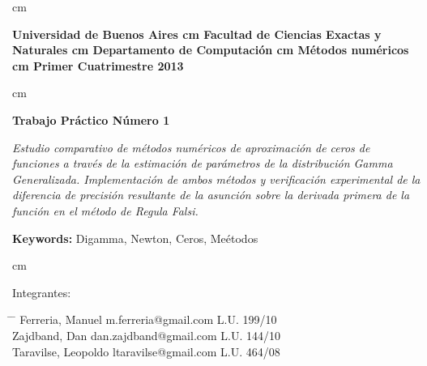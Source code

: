  cm
\begin{flushright}
\huge\bf Universidad de Buenos Aires
 cm
\Large\bf Facultad de Ciencias Exactas y Naturales
 cm
\Large\bf Departamento de Computaci\'on
 cm
\Large\bf  M\'etodos num\'ericos
 cm
\Large\bf Primer Cuatrimestre 2013
\end{flushright}

 cm
\begin{center}
\LARGE\bf Trabajo Pr\'actico N\'umero 1

\vskip 1.0cm
\normalsize \emph{Estudio comparativo de m\'etodos num\'ericos de aproximaci\'on de ceros de funciones a trav\'es de la estimaci\'on de par\'ametros de la distribuci\'on Gamma Generalizada. Implementaci\'on de ambos m\'etodos y verificaci\'on experimental de la diferencia de precisi\'on resultante de la asunci\'on sobre la derivada primera de la funci\'on en el m\'etodo de Regula Falsi.}

\vskip 1.0cm
\large {\bf Keywords:} Digamma, Newton, Ceros, Me\'etodos

\end{center}



 cm
\begin{flushleft}
\large Integrantes:
\begin{tabbing}
\hspace{5cm} \= \hspace{5.5cm} \= \hspace{3cm} \kill
Ferreria, Manuel \> m.ferreria@gmail.com \> L.U. 199/10  \\
Zajdband, Dan \> dan.zajdband@gmail.com \> L.U. 144/10 \\
Taravilse, Leopoldo \> ltaravilse@gmail.com \> L.U. 464/08\\
\end{tabbing}
\end{flushleft}
